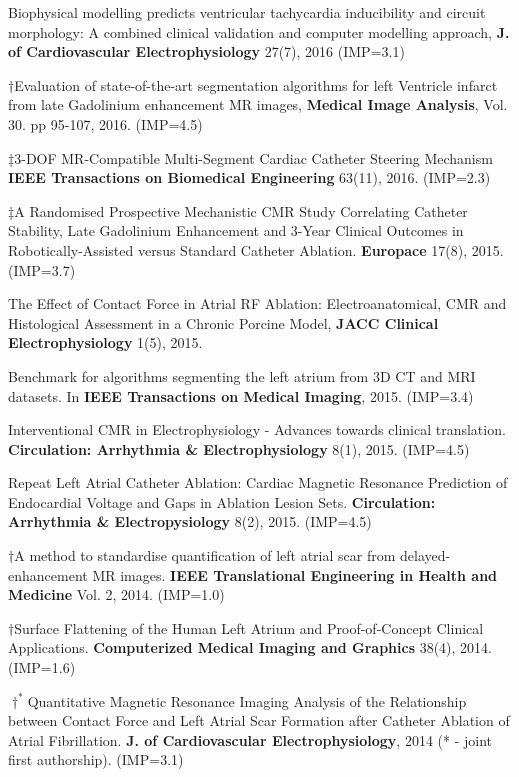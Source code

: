 \begin{etaremune}
\item Biophysical modelling predicts ventricular tachycardia inducibility and circuit morphology:  A combined clinical validation and computer modelling approach, \textbf{J. of Cardiovascular Electrophysiology} 27(7), 2016 (IMP=3.1)
\item $\dagger$Evaluation of state-of-the-art segmentation algorithms for left Ventricle infarct from late Gadolinium enhancement MR images, \textbf{Medical Image Analysis}, Vol. 30. pp 95-107, 2016. (IMP=4.5)
\item $\ddagger$3-DOF MR-Compatible Multi-Segment Cardiac Catheter Steering Mechanism \textbf{IEEE Transactions on Biomedical Engineering} 63(11), 2016. (IMP=2.3)
\item $\ddagger$A Randomised Prospective Mechanistic CMR Study Correlating Catheter Stability, Late Gadolinium Enhancement and 3-Year Clinical Outcomes in Robotically-Assisted versus Standard Catheter Ablation.  \textbf{Europace} 17(8), 2015. (IMP=3.7)
\item The Effect of Contact Force in Atrial RF Ablation: Electroanatomical, CMR and Histological Assessment in a Chronic Porcine Model, \textbf{JACC Clinical Electrophysiology} 1(5), 2015. 
\item Benchmark for algorithms segmenting the left atrium from 3D CT and MRI datasets. In \textbf{IEEE Transactions on Medical Imaging}, 2015. (IMP=3.4)
\item Interventional CMR in Electrophysiology - Advances towards clinical translation. \textbf{Circulation: Arrhythmia \& Electrophysiology} 8(1), 2015. (IMP=4.5)
\item Repeat Left Atrial Catheter Ablation: Cardiac Magnetic Resonance Prediction of Endocardial Voltage and Gaps in Ablation Lesion Sets. \textbf{Circulation: Arrhythmia \& Electropysiology} 8(2), 2015. (IMP=4.5)
\item $\dagger$A method to standardise quantification of left atrial scar from delayed-enhancement MR images. \textbf{IEEE Translational Engineering in Health and Medicine} Vol. 2, 2014. (IMP=1.0)
\item $\dagger$Surface Flattening of the Human Left Atrium and Proof-of-Concept Clinical Applications. \textbf{Computerized Medical Imaging and Graphics} 38(4), 2014. (IMP=1.6)
\item $\dagger^*$Quantitative Magnetic Resonance Imaging Analysis of the Relationship between Contact Force and Left Atrial Scar Formation after Catheter Ablation of Atrial Fibrillation. \textbf{J. of Cardiovascular Electrophysiology}, 2014 (* - joint first authorship). (IMP=3.1)

\end{etaremune}
